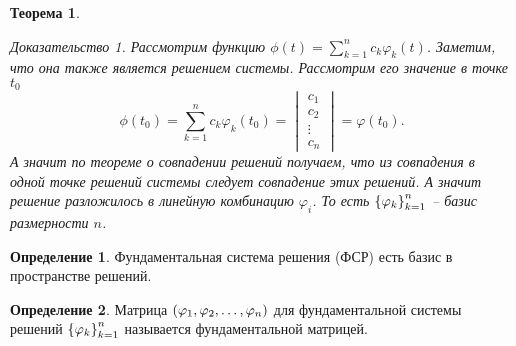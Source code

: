 \documentclass[a5paper, 10pt]{article}
\theoremstyle{definition}
\newtheorem{Def}{Определение}
\theoremstyle{plain}
\newtheorem{Th}{Теорема}
\theoremstyle{remark}
\newtheorem*{Proof}{Доказательство}
\begin{document}
\begin{Th}
\begin{Proof}
			Рассмотрим функцию $\phi(t) = \sum\limits_{k=1}^n c_k \varphi_k(t)$. Заметим, что она также является решением системы. Рассмотрим его значение в точке $t_0$
			\[
			\phi(t_0) = \sum\limits_{k=1}^n c_k \varphi_k(t_0) = \begin{vmatrix}
				c_1\\c_2\\\vdots\\c_n
			\end{vmatrix} = \varphi(t_0).
			\]
			А значит по теореме о совпадении решений получаем, что из совпадения в одной точке решений системы следует совпадение этих решений. А значит решение разложилось в линейную комбинацию $\varphi_i$. То есть $\left\{\varphi_k\right\}_{k=1}^n$ -- базис размерности $n$.
		\end{Proof}
	\end{Th}
	\begin{Def}
		Фундаментальная система решения (ФСР) есть базис в пространстве решений.
	\end{Def}
	\begin{Def}
		Матрица $\left(\varphi_1, \varphi_2, \dots, \varphi_n\right)$ для фундаментальной системы решений $\left\{\varphi_k\right\}_{k=1}^n$ называется фундаментальной матрицей.
	\end{Def}
\end{document}
